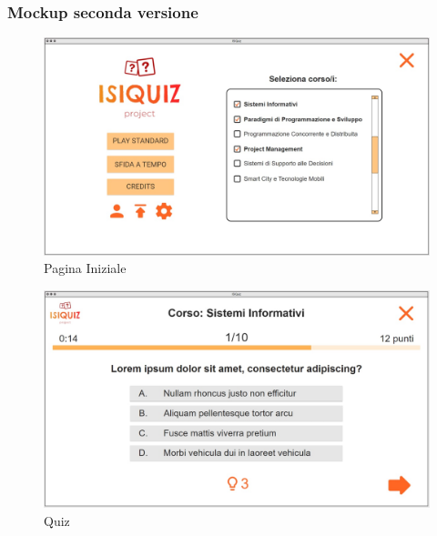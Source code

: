         \subsubsection{Mockup seconda versione}\label{mockup2}
        
        \begin{figure}[H]
            \centering
            \includegraphics[width=\textwidth]{Images/mockup/home2.jpg}
            \caption{Pagina Iniziale}
            \label{fig:HomePage2}
        \end{figure}
        
        \begin{figure}[H]
            \centering
            \includegraphics[width=\textwidth]{Images/mockup/quiz2.jpg}
            \caption{Quiz}
            \label{fig:Quiz2}
        \end{figure}
        
